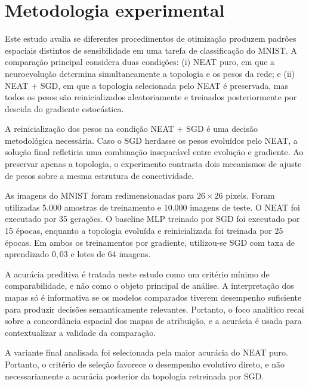 
\section{Metodologia experimental}

Este estudo avalia se diferentes procedimentos de otimiza\c{c}\~ao produzem
padr\~oes espaciais distintos de sensibilidade em uma tarefa de classifica\c{c}\~ao
do MNIST. A compara\c{c}\~ao principal considera duas condi\c{c}\~oes: (i) NEAT puro,
em que a neuroevolu\c{c}\~ao determina simultaneamente a topologia e os pesos da
rede; e (ii) NEAT + SGD, em que a topologia selecionada pelo NEAT \'{e}
preservada, mas todos os pesos s\~ao reinicializados aleatoriamente e treinados
posteriormente por descida do gradiente estoc\'astica.

A reinicializa\c{c}\~ao dos pesos na condi\c{c}\~ao NEAT + SGD \'{e} uma decis\~ao
metodol\'ogica necess\'aria. Caso o SGD herdasse os pesos evolu\'idos pelo NEAT, a
solu\c{c}\~ao final refletiria uma combina\c{c}\~ao insepar\'avel entre evolu\c{c}\~ao e
gradiente. Ao preservar apenas a topologia, o experimento contrasta dois
mecanismos de ajuste de pesos sobre a mesma estrutura de conectividade.

As imagens do MNIST foram redimensionadas para $26 \times 26$ pixels. Foram
utilizadas 5.000 amostras de treinamento e 10.000 imagens de teste. O NEAT foi
executado por 35 gera\c{c}\~oes. O baseline MLP treinado por SGD foi executado por
15 \'{e}pocas, enquanto a topologia evolu\'ida e reinicializada foi treinada por
25 \'{e}pocas. Em ambos os treinamentos por gradiente, utilizou-se SGD com taxa
de aprendizado $0{,}03$ e lotes de 64 imagens.

A acur\'acia preditiva \'{e} tratada neste estudo como um crit\'erio m\'inimo de
comparabilidade, e n\~ao como o objeto principal de an\'alise. A interpreta\c{c}\~ao
dos mapas s\'o \'{e} informativa se os modelos comparados tiverem desempenho
suficiente para produzir decis\~oes semanticamente relevantes. Portanto, o foco
anal\'itico recai sobre a concord\^ancia espacial dos mapas de atribui\c{c}\~ao, e a
acur\'acia \'{e} usada para contextualizar a validade da compara\c{c}\~ao.

A variante final analisada foi selecionada pela maior acur\'acia do NEAT puro.
Portanto, o crit\'erio de sele\c{c}\~ao favorece o desempenho evolutivo direto, e
n\~ao necessariamente a acur\'acia posterior da topologia retreinada por SGD.

